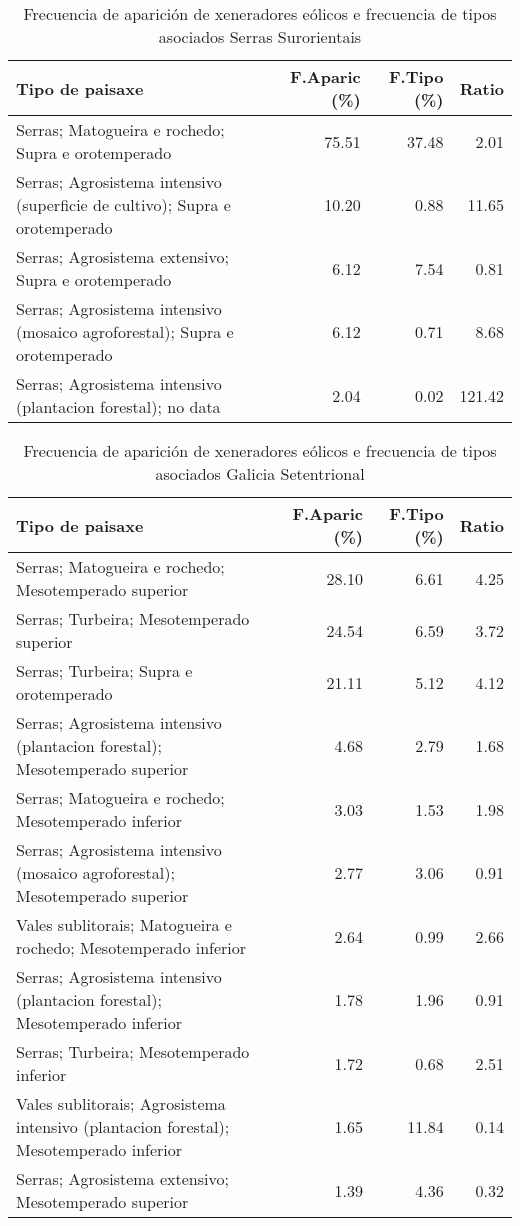 \begin{table}[p]
\centering
\caption{Frecuencia de aparición de xeneradores eólicos e frecuencia de tipos asociados Serras Surorientais} 
\label{veolico9}
\begin{tabular}{lrrr}
  \hline
Tipo de paisaxe & F.Aparic (\%) & F.Tipo (\%) & Ratio \\ 
  \hline
Serras; Matogueira e rochedo; Supra e orotemperado & 75.51 & 37.48 & 2.01 \\ 
  Serras; Agrosistema intensivo (superficie de cultivo); Supra e orotemperado & 10.20 & 0.88 & 11.65 \\ 
  Serras; Agrosistema extensivo; Supra e orotemperado & 6.12 & 7.54 & 0.81 \\ 
  Serras; Agrosistema intensivo (mosaico agroforestal); Supra e orotemperado & 6.12 & 0.71 & 8.68 \\ 
  Serras; Agrosistema intensivo (plantacion forestal); no data & 2.04 & 0.02 & 121.42 \\ 
   \hline
\end{tabular}
\end{table}
\begin{table}[p]
\centering
\caption{Frecuencia de aparición de xeneradores eólicos e frecuencia de tipos asociados Galicia Setentrional} 
\label{veolico10}
\begin{tabular}{lrrr}
  \hline
Tipo de paisaxe & F.Aparic (\%) & F.Tipo (\%) & Ratio \\ 
  \hline
Serras; Matogueira e rochedo; Mesotemperado superior & 28.10 & 6.61 & 4.25 \\ 
  Serras; Turbeira; Mesotemperado superior & 24.54 & 6.59 & 3.72 \\ 
  Serras; Turbeira; Supra e orotemperado & 21.11 & 5.12 & 4.12 \\ 
  Serras; Agrosistema intensivo (plantacion forestal); Mesotemperado superior & 4.68 & 2.79 & 1.68 \\ 
  Serras; Matogueira e rochedo; Mesotemperado inferior & 3.03 & 1.53 & 1.98 \\ 
  Serras; Agrosistema intensivo (mosaico agroforestal); Mesotemperado superior & 2.77 & 3.06 & 0.91 \\ 
  Vales sublitorais; Matogueira e rochedo; Mesotemperado inferior & 2.64 & 0.99 & 2.66 \\ 
  Serras; Agrosistema intensivo (plantacion forestal); Mesotemperado inferior & 1.78 & 1.96 & 0.91 \\ 
  Serras; Turbeira; Mesotemperado inferior & 1.72 & 0.68 & 2.51 \\ 
  Vales sublitorais; Agrosistema intensivo (plantacion forestal); Mesotemperado inferior & 1.65 & 11.84 & 0.14 \\ 
  Serras; Agrosistema extensivo; Mesotemperado superior & 1.39 & 4.36 & 0.32 \\ 
   \hline
\end{tabular}
\end{table}
